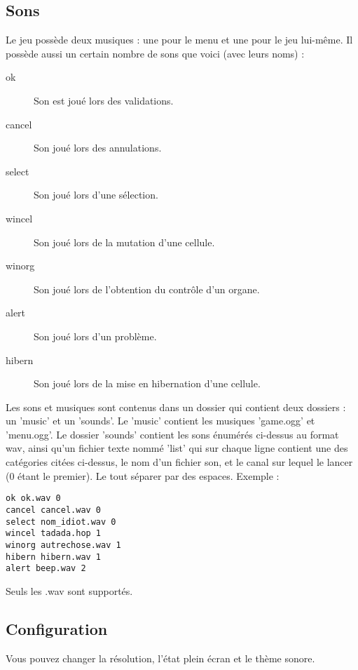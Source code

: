 \documentclass{article}
\begin{document}
\subsection{Sons}
Le jeu possède deux musiques : une pour le menu et une pour le jeu lui-même. Il possède aussi un certain nombre de sons que voici (avec leurs noms) :
\begin{description}
	\item[ok] Son est joué lors des validations.
	\item[cancel] Son joué lors des annulations.
	\item[select] Son joué lors d'une sélection.
	\item[wincel] Son joué lors de la mutation d'une cellule.
	\item[winorg] Son joué lors de l'obtention du contrôle d'un organe.
	\item[alert] Son joué lors d'un problème.
	\item[hibern] Son joué lors de la mise en hibernation d'une cellule.
\end{description}
Les sons et musiques sont contenus dans un dossier qui contient deux dossiers : un 'music' et un 'sounds'. Le 'music' contient les musiques 'game.ogg' et 'menu.ogg'. Le dossier 'sounds' contient les sons énumérés ci-dessus au format wav, ainsi qu'un fichier texte nommé 'list' qui sur chaque ligne contient une des catégories citées ci-dessus, le nom d'un fichier son, et le canal sur lequel le lancer (0 étant le premier). Le tout séparer par des espaces. Exemple :
\begin{verbatim}
ok ok.wav 0
cancel cancel.wav 0
select nom_idiot.wav 0
wincel tadada.hop 1
winorg autrechose.wav 1
hibern hibern.wav 1
alert beep.wav 2
\end{verbatim}
Seuls les .wav sont supportés.

\subsection{Configuration}
Vous pouvez changer la résolution, l'état plein écran et le thème sonore.
\end{document}
